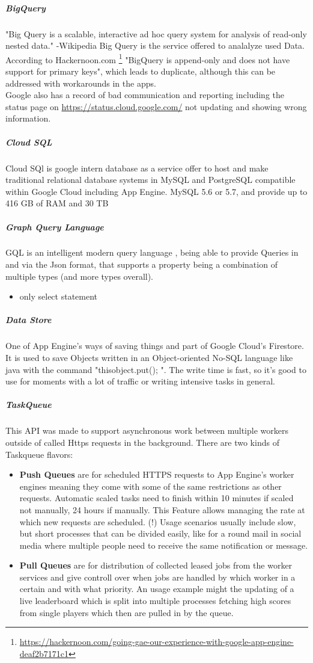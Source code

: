 \documentclass{article}
\begin{document}
 \subparagraph{BigQuery}
 "Big Query is a scalable, interactive ad hoc query system for analysis of read-only nested data." -Wikipedia 
 Big Query is the service offered to analalyze used Data. According to Hackernoon.com \footnote{\url{https://hackernoon.com/going-gae-our-experience-with-google-app-engine-deaf2b7171c1}} "BigQuery is append-only and does not have support for primary keys", which leads to duplicate, although this can be addressed with workarounds in the apps. \\
 Google also has a record of bad communication and reporting including the status page on \url{https://status.cloud.google.com/} not updating and showing wrong information. 
 \subparagraph{Cloud SQL}
 Cloud SQl is google intern database as a service offer to host and make traditional relational database systems in MySQL and PostgreSQL compatible within Google Cloud including App Engine.  MySQL 5.6 or 5.7, and provide up to 416 GB of RAM and 30 TB
 \subparagraph{Graph Query Language}
 GQL is an intelligent modern query language , being able to provide Queries in and via the Json format, that supports a property being a combination of multiple types (and more types overall).
 \begin{itemize}
 	\item only select statement
 \end{itemize}
 \subparagraph{Data Store}
 One of App Engine's ways of saving things and part of Google Cloud's Firestore. It is used to save Objects written in an Object-oriented No-SQL language like java with the command "thisobject.put(); ". The write time is fast, so it's good to use for moments with a lot of traffic or writing intensive tasks in general.
 \subparagraph{TaskQueue}
 This API was made to support asynchronous work between multiple workers outside of called Https requests in the background.  There are two kinds of Taskqueue flavors: 
 \begin{itemize}
  \item \textbf{\small Push Queues}
   are for scheduled HTTPS requests to App Engine's worker engines meaning they come with some of the same restrictions as other requests. Automatic scaled tasks need to finish within 10 minutes if scaled not manually, 24 hours if manually.  This Feature allows managing the rate at which new requests are scheduled. (!)
   Usage scenarios usually include slow, but short processes that can be divided easily, like for a round mail in social media where multiple people need to receive the same notification or message.
  \item \textbf{\small Pull Queues} 
  are for distribution of collected leased jobs from the worker services and give controll over when jobs are handled by which worker in a certain and with what priority. An usage example might the updating of a live leaderboard which is split into multiple processes fetching high scores from single players which then are pulled in by the queue.
  
  
  
  
 \end{itemize}
\end{document}
